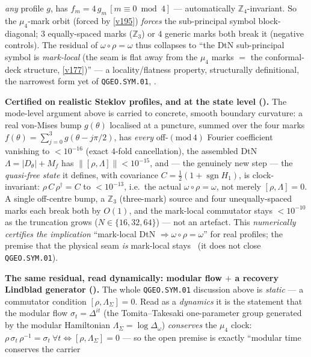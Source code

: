 \documentclass[11pt,a4paper]{article}
\newcommand{\Z}{\mathbb Z}
\begin{document}
\begin{keybox}
\emph{any} profile $g$, has $f_m=4\,g_m\,[m\equiv0\bmod4]$ --- automatically $\Z_4$-invariant. So the
$\mu_4$-mark orbit (forced by \vref{v195}) \emph{forces} the sub-principal symbol block-diagonal; $3$
equally-spaced marks ($\Z_3$) or $4$ generic marks both break it (negative controls). The residual of
$\omega\circ\rho=\omega$ thus collapses to ``the DtN sub-principal symbol is \emph{mark-local} (the seam is
flat away from the $\mu_4$ marks $=$ the conformal-deck structure, \vref{v177})'' --- a locality/flatness
property, structurally definitional, the narrowest form yet of \texttt{QGEO.SYM.01}, \mO.
\par\smallskip\noindent\textbf{Certified on realistic Steklov profiles, and at the state level
().} The mode-level argument above is carried to concrete, smooth boundary
curvature: a real von-Mises bump $g(\theta)$ localised at a puncture, summed over the four marks
$f(\theta)=\sum_{j=0}^{3}g(\theta-j\pi/2)$, has \emph{every} off-$(\mathrm{mod}\,4)$ Fourier coefficient
vanishing to $<10^{-16}$ (exact $4$-fold cancellation), the assembled DtN $\Lambda=|D_\theta|+M_f$ has
$\|[\rho,\Lambda]\|<10^{-15}$, and --- the genuinely new step --- the \emph{quasi-free state} it defines,
with covariance $C=\tfrac12(1+\operatorname{sgn}H_1)$, is clock-invariant: $\rho\,C\,\rho^\dagger=C$ to
$<10^{-13}$, i.e.\ the actual $\omega\circ\rho=\omega$, not merely $[\rho,\Lambda]=0$. A single off-centre
bump, a $\Z_3$ (three-mark) source and four unequally-spaced marks each break both by $O(1)$, and the
mark-local commutator stays $<10^{-10}$ as the truncation grows ($N\in\{16,32,64\}$) --- not an artefact.
This \emph{numerically certifies the implication} ``mark-local DtN $\Rightarrow\omega\circ\rho=\omega$'' for
real profiles; the premise that the physical seam \emph{is} mark-local stays \mO\ (it does not close
\texttt{QGEO.SYM.01}).
\par\smallskip\noindent\textbf{The same residual, read dynamically: modular flow $+$ a recovery
Lindblad generator ().} The whole \texttt{QGEO.SYM.01}
discussion above is \emph{static} --- a commutator condition $[\rho,\Lambda_\Sigma]=0$. Read as a
\emph{dynamics} it is the statement that the modular flow $\sigma_t=\Delta^{it}$ (the Tomita--Takesaki
one-parameter group generated by the modular Hamiltonian $\Lambda_\Sigma=\log\Delta_\omega$)
\emph{conserves} the $\mu_4$ clock: $\rho\,\sigma_t\,\rho^{-1}=\sigma_t\ \forall t\Leftrightarrow
[\rho,\Lambda_\Sigma]=0$ --- so the open premise is exactly ``modular time conserves the carrier

\end{keybox}
\end{document}
